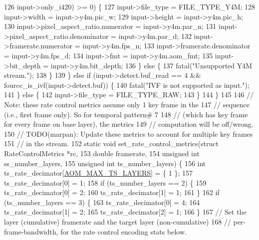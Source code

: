 \begin{DoxyCodeInclude}
126                        input->only\_i420) >= 0) \{
127       input->file\_type = FILE\_TYPE\_Y4M;
128       input->width = input->y4m.pic\_w;
129       input->height = input->y4m.pic\_h;
130       input->pixel\_aspect\_ratio.numerator = input->y4m.par\_n;
131       input->pixel\_aspect\_ratio.denominator = input->y4m.par\_d;
132       input->framerate.numerator = input->y4m.fps\_n;
133       input->framerate.denominator = input->y4m.fps\_d;
134       input->fmt = input->y4m.aom\_fmt;
135       input->bit\_depth = input->y4m.bit\_depth;
136     \} \textcolor{keywordflow}{else} \{
137       fatal(\textcolor{stringliteral}{"Unsupported Y4M stream."});
138     \}
139   \} \textcolor{keywordflow}{else} \textcolor{keywordflow}{if} (input->detect.buf\_read == 4 && fourcc\_is\_ivf(input->detect.buf)) \{
140     fatal(\textcolor{stringliteral}{"IVF is not supported as input."});
141   \} \textcolor{keywordflow}{else} \{
142     input->file\_type = FILE\_TYPE\_RAW;
143   \}
144 \}
145 
146 \textcolor{comment}{// Note: these rate control metrics assume only 1 key frame in the}
147 \textcolor{comment}{// sequence (i.e., first frame only). So for temporal pattern# 7}
148 \textcolor{comment}{// (which has key frame for every frame on base layer), the metrics}
149 \textcolor{comment}{// computation will be off/wrong.}
150 \textcolor{comment}{// TODO(marpan): Update these metrics to account for multiple key frames}
151 \textcolor{comment}{// in the stream.}
152 \textcolor{keyword}{static} \textcolor{keywordtype}{void} set\_rate\_control\_metrics(\textcolor{keyword}{struct} RateControlMetrics *rc,
153                                      \textcolor{keywordtype}{double} framerate,
154                                      \textcolor{keywordtype}{unsigned} \textcolor{keywordtype}{int} ss\_number\_layers,
155                                      \textcolor{keywordtype}{unsigned} \textcolor{keywordtype}{int} ts\_number\_layers) \{
156   \textcolor{keywordtype}{int} ts\_rate\_decimator[\hyperlink{group__aom__encoder_ga5ecd6f60f02c807e0de37df7b7278f4e}{AOM\_MAX\_TS\_LAYERS}] = \{ 1 \};
157   ts\_rate\_decimator[0] = 1;
158   \textcolor{keywordflow}{if} (ts\_number\_layers == 2) \{
159     ts\_rate\_decimator[0] = 2;
160     ts\_rate\_decimator[1] = 1;
161   \}
162   \textcolor{keywordflow}{if} (ts\_number\_layers == 3) \{
163     ts\_rate\_decimator[0] = 4;
164     ts\_rate\_decimator[1] = 2;
165     ts\_rate\_decimator[2] = 1;
166   \}
167   \textcolor{comment}{// Set the layer (cumulative) framerate and the target layer (non-cumulative)}
168   \textcolor{comment}{// per-frame-bandwidth, for the rate control encoding stats below.}

\end{DoxyCodeInclude}
